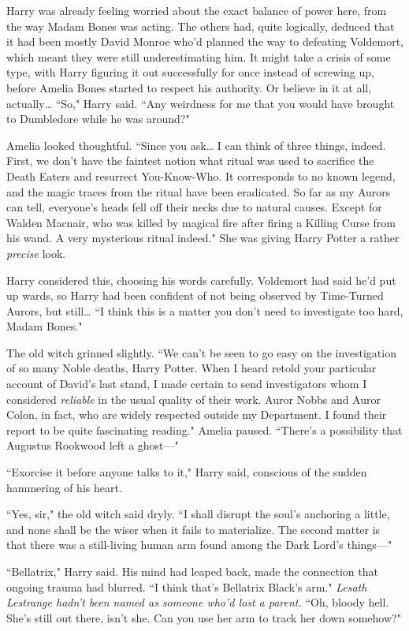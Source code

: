 Harry was already feeling worried about the exact balance of power here, from the way Madam Bones was acting. The others had, quite logically, deduced that it had been mostly David Monroe who'd planned the way to defeating Voldemort, which meant they were still underestimating him. It might take a crisis of some type, with Harry figuring it out successfully for once instead of screwing up, before Amelia Bones started to respect his authority. Or believe in it at all, actually{\ldots} ``So," Harry said. ``Any weirdness for me that you would have brought to Dumbledore while he was around?"

Amelia looked thoughtful. ``Since you ask{\ldots} I can think of three things, indeed. First, we don't have the faintest notion what ritual was used to sacrifice the Death Eaters and resurrect You-Know-Who. It corresponds to no known legend, and the magic traces from the ritual have been eradicated. So far as my Aurors can tell, everyone's heads fell off their necks due to natural causes. Except for Walden Macnair, who was killed by magical fire after firing a Killing Curse from his wand. A very mysterious ritual indeed." She was giving Harry Potter a rather \emph{precise} look.

Harry considered this, choosing his words carefully. Voldemort had said he'd put up wards, so Harry had been confident of not being observed by Time-Turned Aurors, but still{\ldots} ``I think this is a matter you don't need to investigate too hard, Madam Bones."

The old witch grinned slightly. ``We can't be seen to go easy on the investigation of so many Noble deaths, Harry Potter. When I heard retold your particular account of David's last stand, I made certain to send investigators whom I considered \emph{reliable} in the usual quality of their work. Auror Nobbs and Auror Colon, in fact, who are widely respected outside my Department. I found their report to be quite fascinating reading." Amelia paused. ``There's a possibility that Augustus Rookwood left a ghost—"

``Exorcise it before anyone talks to it," Harry said, conscious of the sudden hammering of his heart.

``Yes, sir," the old witch said dryly. ``I shall disrupt the soul's anchoring a little, and none shall be the wiser when it fails to materialize. The second matter is that there was a still-living human arm found among the Dark Lord's things—"

``Bellatrix," Harry said. His mind had leaped back, made the connection that ongoing trauma had blurred. ``I think that's Bellatrix Black's arm." \emph{Lesath Lestrange hadn't been named as someone who'd lost a parent.} ``Oh, bloody hell. She's still out there, isn't she. Can you use her arm to track her down somehow?"

